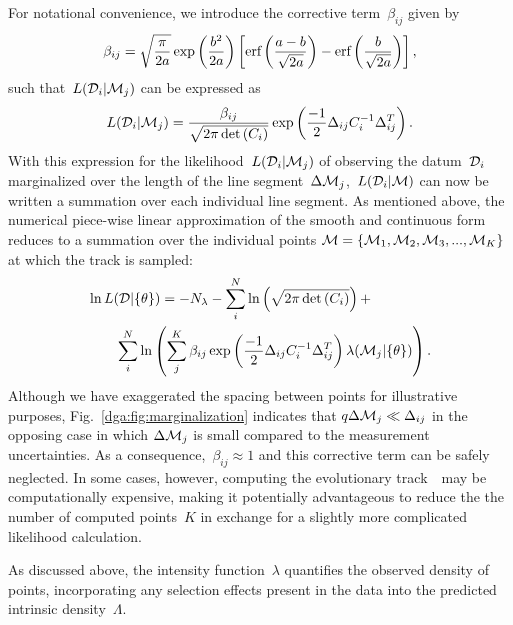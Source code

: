 For notational convenience, we introduce the corrective term~$\beta_{ij}$ given
by
\begin{equation}
\beta_{ij} = \sqrt{\frac{\pi}{2a}} \exp\left(\frac{b^2}{2a}\right)
\left[\text{erf}\left(\frac{a - b}{\sqrt{2a}}\right) - \text{erf}\left(\frac{b}{\sqrt{2a}}
\right)\right],
\label{dga:eq:corrective_beta}
\end{equation}
such that~$L(\mathcal{D}_i | \mathcal{M}_j)$ can be expressed as
\begin{equation}
L(\mathcal{D}_i | \mathcal{M}_j) = \frac{\beta_{ij}}{\sqrt{2\pi \det{(C_i)}}}
\exp\left(\frac{-1}{2}\Delta_{ij} C_i^{-1} \Delta_{ij}^T\right).
\end{equation}
With this expression for the likelihood~$L(\mathcal{D}_i | \mathcal{M}_j)$ of
observing the datum~$\mathcal{D}_i$ marginalized over the length of the line
segment~$\Delta\mathcal{M}_j$,~$L(\mathcal{D}_i | \mathcal{M})$ can now be
written a summation over each individual line segment.
As mentioned above, the numerical piece-wise linear approximation of the smooth
and continuous form reduces to a summation over the individual points
$\mathcal{M} = \{\mathcal{M}_1, \mathcal{M}_2, \mathcal{M}_3, ..., \mathcal{M}_K\}$
at which the track is sampled:
\begin{equation}\begin{split}
&\ln L(\mathcal{D} | \{\theta\}) = -N_\lambda
- \sum_i^N \ln \left(\sqrt{2\pi \det{(C_i)}}\right) +
\\
&\qquad \sum_i^N \ln \left(
\sum_j^K \beta_{ij}
\exp\left(\frac{-1}{2}\Delta_{ij}C_i^{-1}\Delta_{ij}^T\right)
\lambda(\mathcal{M}_j | \{\theta\})
\right).
\end{split}\end{equation}
Although we have exaggerated the spacing between points for illustrative
purposes, Fig.~\ref{dga:fig:marginalization} indicates that
$q\Delta\mathcal{M}_j \ll \Delta_{ij}$ in the opposing case in which
$\Delta\mathcal{M}_j$ is small compared to the measurement uncertainties.
As a consequence,~$\beta_{ij} \approx 1$ and this corrective term can be safely
neglected.
In some cases, however, computing the evolutionary track~~may be
computationally expensive, making it potentially advantageous to reduce the
the number of computed points~$K$ in exchange for a slightly more complicated
likelihood calculation.
\par
As discussed above, the intensity function~$\lambda$ quantifies the observed
density of points, incorporating any selection effects present in the data into
the predicted intrinsic density~$\Lambda$.
